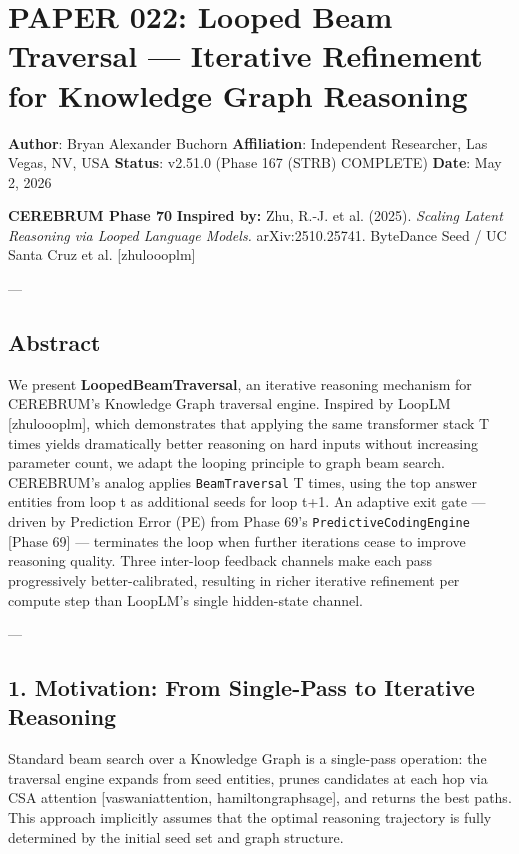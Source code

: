 \section{PAPER 022: Looped Beam Traversal — Iterative Refinement for Knowledge Graph Reasoning}

\textbf{Author}: Bryan Alexander Buchorn  
\textbf{Affiliation}: Independent Researcher, Las Vegas, NV, USA  
\textbf{Status}: v2.51.0 (Phase 167 (STRB) COMPLETE)
\textbf{Date}: May 2, 2026

\textbf{CEREBRUM Phase 70}  
\textbf{Inspired by:} Zhu, R.-J. et al. (2025). \textit{Scaling Latent Reasoning via Looped Language Models.} arXiv:2510.25741. ByteDance Seed / UC Santa Cruz et al. [zhu\-loooplm]

---

\subsection{Abstract}

We present \textbf{LoopedBeamTraversal}, an iterative reasoning mechanism for CEREBRUM's Knowledge Graph traversal engine. Inspired by LoopLM [zhu\-loooplm], which demon\-strates that applying the same transformer stack T times yields drama\-tically better reasoning on hard inputs without increasing parameter count, we adapt the looping principle to graph beam search. CEREBRUM's analog applies \texttt{BeamTraversal} T times, using the top answer entities from loop t as additional seeds for loop t+1. An adaptive exit gate — driven by Prediction Error (PE) from Phase 69's \texttt{PredictiveCodingEngine} [Phase 69] — terminates the loop when further iterations cease to improve reasoning quality. Three inter-loop feedback channels make each pass progr\-essively better-calibrated, resulting in richer iterative refinement per compute step than LoopLM's single hidden-state channel.

---

\subsection{1. Motivation: From Single-Pass to Iterative Reasoning}

Standard beam search over a Knowledge Graph is a single-pass operation: the traversal engine expands from seed entities, prunes candidates at each hop via CSA attention [vaswani\-attention, hamilton\-graphsage], and returns the best paths. This approach implicitly assumes that the optimal reasoning trajectory is fully determined by the initial seed set and graph structure.

